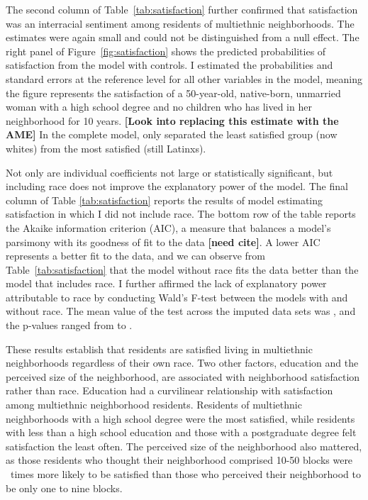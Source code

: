 \documentclass{baderart}
\begin{document}

The second column of Table~\ref{tab:satisfaction} further confirmed that satisfaction was an interracial sentiment among residents of multiethnic neighborhoods. The estimates were again small and could not be distinguished from a null effect. The right panel of Figure~\ref{fig:satisfaction} shows the predicted probabilities of satisfaction from the model with controls. I estimated the probabilities and standard errors at the reference level for all other variables in the model, meaning the figure represents the satisfaction of a 50-year-old, native-born, unmarried woman with a high school degree and no children who has lived in her neighborhood for 10 years. \textbf{{[}Look into replacing this estimate with the AME{]}} In the complete model, only \maxdiffthree separated the least satisfied group (now whites) from the most satisfied (still Latinxs).

Not only are individual coefficients not large or statistically significant, but including race does not improve the explanatory power of the model. The final column of Table \ref{tab:satisfaction} reports the results of model estimating satisfaction in which I did not include race. The bottom row of the table reports the Akaike information criterion (AIC), a measure that balances a model's parsimony with its goodness of fit to the data \textbf{{[}need cite{]}}. A lower AIC represents a better fit to the data, and we can observe from Table~\ref{tab:satisfaction} that the model without race fits the data better than the model that includes race. I further affirmed the lack of explanatory power attributable to race by conducting Wald's F-test between the models with and without race. The mean value of the test across the imputed data sets was \satWaldF, and the p-values ranged from \satWaldpMin to \satWaldpMax.

These results establish that residents are satisfied living in multiethnic neighborhoods regardless of their own race. Two other factors, education and the perceived size of the neighborhood, are associated with neighborhood satisfaction rather than race. Education had a curvilinear relationship with satisfaction among multiethnic neighborhood residents. Residents of multiethnic neighborhoods with a high school degree were the most satisfied, while residents with less than a high school education and those with a postgraduate degree felt satisfaction the least often. The perceived size of the neighborhood also mattered, as those residents who thought their neighborhood comprised 10-50 blocks were \satnhdsize\ times more likely to be satisfied than those who perceived their neighborhood to be only one to nine blocks. 
\end{document}

